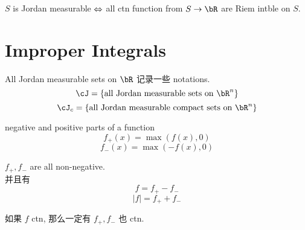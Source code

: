 \documentclass[lang=cn,11pt]{elegantbook}
\begin{document}
\begin{corollary}
    $S$ is Jordan measurable $\Leftrightarrow$ all ctn function from $S \rar \bR$ are Riem intble on $S$.
\end{corollary}




\section{Improper Integrals}
\begin{definition}{All Jordan measurable sets on $\bR$}
    记录一些 notations.\\
    $$
    \cJ = \{ \text{all Jordan measurable sets on } \bR^n \}
    $$
    $$
    \cJ_c = \{ \text{all Jordan measurable compact sets on } \bR^n \}
    $$
\end{definition}


\begin{definition}{negative and positive parts of a function}
    $$
    f_+ (x) = \max(f(x), 0)
    $$
    $$
    f_- (x) = \max(-f(x), 0)
    $$
\end{definition}

\begin{note}
    $f_+, f_-$ are all non-negative.\\
    并且有
    $$
    f = f_+ - f_-
    $$
    $$
    |f| = f_+ + f_-
    $$
\end{note}


\begin{remark}
    如果 $f$ ctn, 那么一定有 $f_+, f_-$ 也 ctn.
\end{remark}
\end{document}
